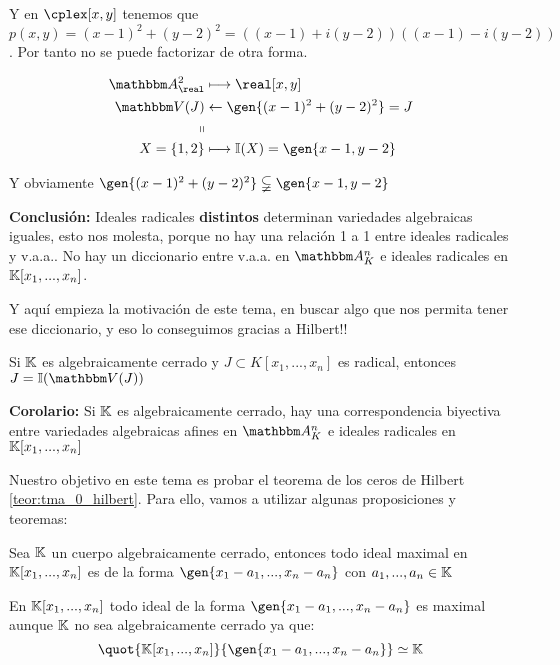 \begin{itemize}
\begin{example}
\begin{enumerate}
			Y en $\cplex[x,y]$ tenemos que $p(x,y)=(x-1)^2+(y-2)^2=((x-1)+i(y-2))((x-1)-i(y-2))$. Por tanto no se puede factorizar de otra forma.

			\begin{align*}
				\A^2_{\real} & \longmapsto  \real[x,y] \\
				\V(J) & \leftarrow  \gen{(x-1)^2+(y-2)^2}=J \\
				\shortparallel & \\
				X=\{1,2\} & \longmapsto  \I(X)=\gen{x-1,y-2}\\
			\end{align*}

			Y obviamente $\gen{(x-1)^2+(y-2)^2} \subsetneqq \gen{x-1,y-2}$
		\end{enumerate}
	\end{example}
\end{itemize}

\textbf{Conclusión:} Ideales radicales \textbf{distintos} determinan variedades algebraicas iguales, esto nos molesta, porque no hay una relación 1 a 1 entre ideales radicales y v.a.a.. No hay un diccionario entre v.a.a. en $\Akn$ e ideales radicales en $\mathbb{K}[x_1,...,x_n]$.

Y aquí empieza la motivación de este tema, en buscar algo que nos permita tener ese diccionario, y eso lo conseguimos gracias a Hilbert!!

\begin{theorem}\label{teor:tma_0_hilbert}
	Si $\mathbb{K}$ es algebraicamente cerrado y $J \subset K[x_1,...,x_n]$ es radical, entonces $J=\I(\V(J))$
\end{theorem}



\textbf{Corolario:}	Si $\mathbb{K}$ es algebraicamente cerrado, hay una correspondencia biyectiva entre variedades algebraicas afines en $\Akn$ e ideales radicales en $\mathbb{K}[x_1,...,x_n]$

Nuestro objetivo en este tema es probar el teorema de los ceros de Hilbert \ref{teor:tma_0_hilbert}. Para ello, vamos a utilizar algunas proposiciones y teoremas:

\begin{theorem}
	Sea $\mathbb{K}$ un cuerpo algebraicamente cerrado, entonces todo ideal maximal en $\mathbb{K}[x_1,...,x_n]$ es de la forma $\gen{x_1-a_1,...,x_n-a_n}$ con $a_1,...,a_n \in \mathbb{K}$
\end{theorem}

\obs En $\mathbb{K}[x_1,...,x_n]$ todo ideal de la forma $\gen{x_1-a_1,...,x_n-a_n}$ es maximal aunque $\mathbb{K}$ no sea algebraicamente cerrado ya que:
$$ \quot{\K[x_1,...,x_n]}{\gen{x_1-a_1,...,x_n-a_n}} \simeq \K $$

